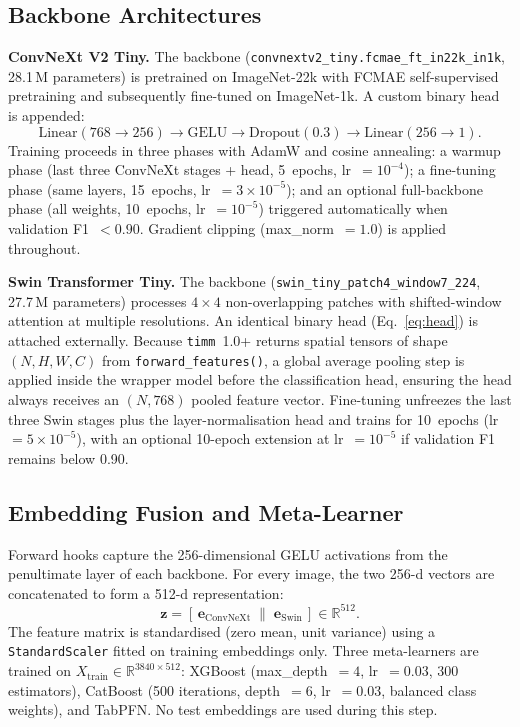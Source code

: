 \documentclass[conference]{IEEEtran}
\begin{document}
\subsection{Backbone Architectures}

\textbf{ConvNeXt V2 Tiny.}  The backbone (\texttt{convnextv2\_tiny.fcmae\_ft\-\_in22k\_in1k},
28.1\,M parameters) is pretrained on ImageNet-22k with FCMAE self-supervised
pretraining and subsequently fine-tuned on ImageNet-1k.  A custom binary head
is appended:
\begin{equation}
  \text{Linear}(768 \to 256) \to \text{GELU} \to \text{Dropout}(0.3)
        \to \text{Linear}(256 \to 1).
  \label{eq:head}
\end{equation}
Training proceeds in three phases with AdamW and cosine annealing: a warmup
phase (last three ConvNeXt stages + head, 5~epochs, lr~$=10^{-4}$); a
fine-tuning phase (same layers, 15~epochs, lr~$=3\times10^{-5}$); and an
optional full-backbone phase (all weights, 10~epochs, lr~$=10^{-5}$) triggered
automatically when validation F1~$<0.90$.  Gradient clipping
(max\_norm~$=1.0$) is applied throughout.

\textbf{Swin Transformer Tiny.}  The backbone (\texttt{swin\_tiny\_patch4\-\_window7\_224},
27.7\,M parameters) processes $4 \times 4$ non-overlapping patches with
shifted-window attention at multiple resolutions.  An identical binary head
(Eq.~\ref{eq:head}) is attached externally.  Because \texttt{timm}~1.0+ returns
spatial tensors of shape $(N, H, W, C)$ from \texttt{forward\_features()}, a
global average pooling step is applied inside the wrapper model before the
classification head, ensuring the head always receives an $(N, 768)$ pooled
feature vector.  Fine-tuning unfreezes the last three Swin stages plus the
layer-normalisation head and trains for 10~epochs (lr~$=5\times10^{-5}$),
with an optional 10-epoch extension at lr~$=10^{-5}$ if validation F1 remains
below 0.90.

\subsection{Embedding Fusion and Meta-Learner}

Forward hooks capture the 256-dimensional GELU activations from the penultimate
layer of each backbone.  For every image, the two 256-d vectors are concatenated
to form a 512-d representation:
\begin{equation}
  \mathbf{z} = [\,\mathbf{e}_{\text{ConvNeXt}}\;\|\;\mathbf{e}_{\text{Swin}}\,]
        \in \mathbb{R}^{512}.
  \label{eq:fusion}
\end{equation}
The feature matrix is standardised (zero mean, unit variance) using a
\texttt{StandardScaler} fitted on training embeddings only.  Three meta-learners
are trained on $X_{\mathrm{train}} \in \mathbb{R}^{3840 \times 512}$: XGBoost
(max\_depth~$=4$, lr~$=0.03$, 300 estimators), CatBoost (500 iterations,
depth~$=6$, lr~$=0.03$, balanced class weights), and TabPFN.  No test embeddings
are used during this step.
\end{document}
